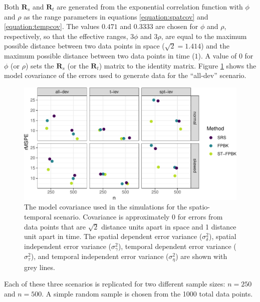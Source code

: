 \documentclass[smallextended]{svjour3}       %
\begin{document}
Both \(\mathbf{R}_{s}\) and \(\mathbf{R}_t\) are generated from the
exponential correlation function with \(\phi\) and \(\rho\) as the range
parameters in equations \ref{equation:spatcov} and
\ref{equation:tempcov}. The values \(0.471\) and \(0.3333\) are chosen
for \(\phi\) and \(\rho\), respectively, so that the effective ranges,
\(3 \phi\) and \(3 \rho\), are equal to the maximum possible distance
between two data points in space (\(\sqrt2 = 1.414\)) and the maximum
possible distance between two data points in time (\(1\)). A value of 0
for \(\phi\) (or \(\rho\)) sets the \(\mathbf{R}_{s}\) (or the
\(\mathbf{R}_t\)) matrix to the identity matrix. Figure
\ref{fig:simcovplot} shows the model covariance of the errors used to
generate data for the ``all-dev'' scenario.

\begin{figure}
\centering
\includegraphics{preprint_springer_files/figure-latex/unnamed-chunk-17-1.pdf}
\caption{\label{fig:simcovplot} The model covariance used in the
simulations for the spatio-temporal scenario. Covariance is
approximately 0 for errors from data points that are \(\sqrt2\) distance
units apart in space and 1 distance unit apart in time. The spatial
dependent error variance (\(\sigma^2_{\delta}\)), spatial independent
error variance (\(\sigma^2_{\gamma}\)), temporal dependent error
variance (\(\sigma^2_{\tau}\)), and temporal independent error variance
(\(\sigma^2_{\eta}\)) are shown with grey lines.}
\end{figure}

Each of these three scenarios is replicated for two different sample
sizes: \(n = 250\) and \(n = 500\). A simple random sample is chosen
from the 1000 total data points.
\end{document}
